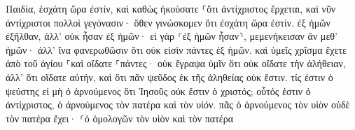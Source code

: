\documentclass{openreader}
\begin{document}
Παιδία, ἐσχάτη ὥρα ἐστίν, καὶ καθὼς ἠκούσατε ⸀ὅτι ἀντίχριστος ἔρχεται, καὶ νῦν ἀντίχριστοι πολλοὶ γεγόνασιν· ὅθεν γινώσκομεν ὅτι ἐσχάτη ὥρα ἐστίν. ἐξ ἡμῶν ἐξῆλθαν, ἀλλ’ οὐκ ἦσαν ἐξ ἡμῶν· εἰ γὰρ ⸂ἐξ ἡμῶν ἦσαν⸃, μεμενήκεισαν ἂν μεθ’ ἡμῶν· ἀλλ’ ἵνα φανερωθῶσιν ὅτι οὐκ εἰσὶν πάντες ἐξ ἡμῶν. καὶ ὑμεῖς χρῖσμα ἔχετε ἀπὸ τοῦ ἁγίου ⸀καὶ οἴδατε ⸀πάντες· οὐκ ἔγραψα ὑμῖν ὅτι οὐκ οἴδατε τὴν ἀλήθειαν, ἀλλ’ ὅτι οἴδατε αὐτήν, καὶ ὅτι πᾶν ψεῦδος ἐκ τῆς ἀληθείας οὐκ ἔστιν. τίς ἐστιν ὁ ψεύστης εἰ μὴ ὁ ἀρνούμενος ὅτι Ἰησοῦς οὐκ ἔστιν ὁ χριστός; οὗτός ἐστιν ὁ ἀντίχριστος, ὁ ἀρνούμενος τὸν πατέρα καὶ τὸν υἱόν. πᾶς ὁ ἀρνούμενος τὸν υἱὸν οὐδὲ τὸν πατέρα ἔχει· ⸂ὁ ὁμολογῶν τὸν υἱὸν καὶ τὸν πατέρα 
\end{document}
